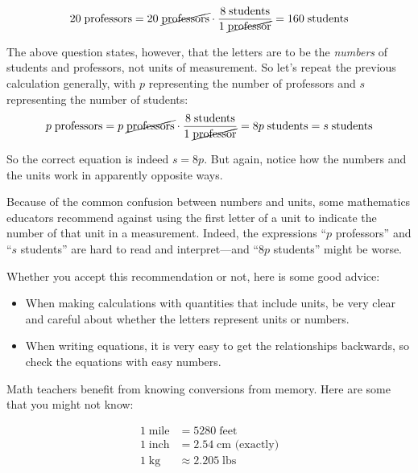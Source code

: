 \documentclass[nooutcomes]{ximera}
\begin{document}
\[
20\;\textrm{professors} = 20\;\cancel{\textrm{professors}} \cdot \frac{{8\;\textrm{students}}}{1\;\cancel{\textrm{professor}}} = 
 160\;\textrm{students}
\]

The above question states, however, that the letters are to be the \emph{numbers} of students and professors, not units of measurement.  So let's repeat the previous calculation generally, with $p$ representing the number of professors and $s$ representing the number of students:  
\[
p\;\textrm{professors} = p\;\cancel{\textrm{professors}} \cdot \frac{{8\;\textrm{students}}}{1\;\cancel{\textrm{professor}}} = 
 8p\;\textrm{students} = s\;\textrm{students}
\]

So the correct equation is indeed $s = 8p$.  But again, notice how the numbers and the units work in apparently opposite ways.  

Because of the common confusion between numbers and units, some mathematics educators recommend against using the first letter of a unit to indicate the number of that unit in a measurement.  Indeed, the expressions ``$p$ professors'' and ``$s$ students'' are hard to read and interpret---and ``$8p$ students'' might be worse.  

Whether you accept this recommendation or not, here is some good advice:  
\begin{itemize}
\item When making calculations with quantities that include units, be very clear and careful about whether the letters represent units or numbers.  
\item When writing equations, it is very easy to get the relationships backwards, so check the equations with easy numbers.  
\end{itemize}

Math teachers benefit from knowing conversions from memory.  Here are some that you might not know:  

\begin{align*}
1\;\textrm{mile} &= 5280\;\textrm{feet} \\
1\;\textrm{inch} &= 2.54\;\textrm{cm (exactly)} \\
1\;\textrm{kg} &\approx 2.205\;\textrm{lbs}\\
\end{align*}
\end{document}

